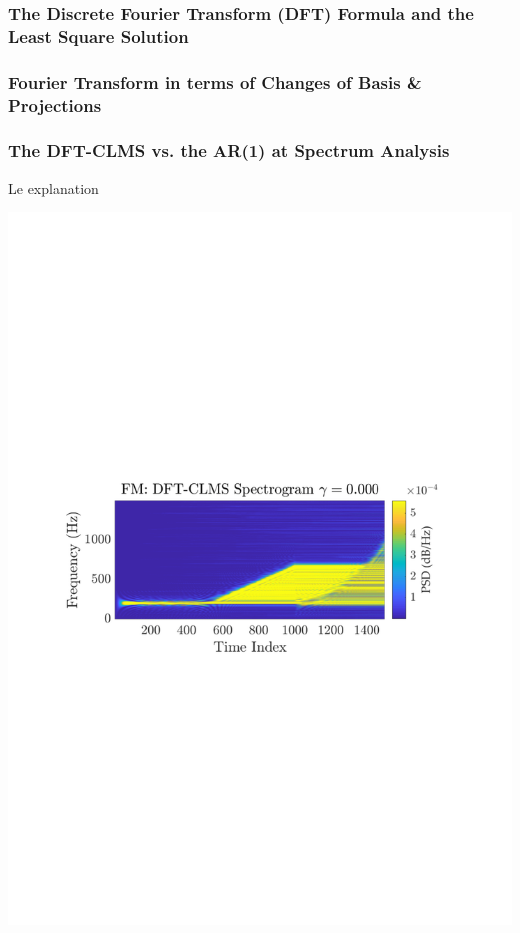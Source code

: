 \documentclass[12pt]{article}
\begin{document}
		\subsubsection{The Discrete Fourier Transform (DFT) Formula and the Least Square Solution}
		\subsubsection{Fourier Transform in terms of Changes of Basis \& Projections}
		\subsubsection{The DFT-CLMS vs. the AR(1) at Spectrum Analysis}
		
			\begin{minipage}[b]{0.49\textwidth}
				Le explanation
			\end{minipage}%
			\begin{minipage}{0.04\textwidth}
				\hspace*{0.04\textwidth}
			\end{minipage}%
			\begin{minipage}{0.49\textwidth}
				\centering
				\includegraphics[trim={2.2cm 11.2cm 3.15cm  11.2cm}, clip, width=\textwidth]{../MATLAB/figures/q3_3c_fig01.pdf} 
				
				\captionsetup{justification=centering}
				\label{fig: 3-3c-no-gamma}
			\end{minipage}%
		
\end{document}
